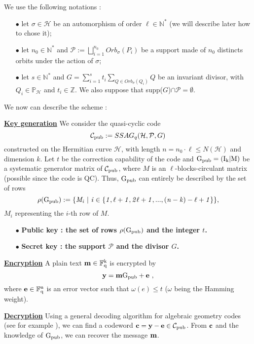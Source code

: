 \documentclass[10pt]{article}
\newcommand{\s}{\vspace{0.3cm}}
\newcommand{\cd}{\cdot}
\newcommand{\N}{\mathbb{N}}
\newcommand{\Z}{\mathbb{Z}}
\newcommand{\fq}{\mathbb{F}_q}
\newcommand{\w}{\omega}
\newcommand{\PR}{\mathcal{P}}
\begin{document}
\s

We use the following notations : 
\begin{enumerate}
\item[$\bullet$] let $\sigma \in \mathcal{H}$ be an automorphism of order $\ell \in \N^*$ (we will describe later how to chose it);
\item[$\bullet$] let $n_0 \in \N^* $ and $\PR := \bigsqcup\limits_{i=1}^{n_0} Orb_{\sigma}(P_i)$ be a support made of $n_0$ distincts orbits under the action of $\sigma$;
\item[$\bullet$] let $s \in \N^*$ and $G = \sum\limits_{i=1}^s t_i \sum\limits_{Q \in Orb_{\sigma}(Q_i)} Q$ be an invariant divisor, with $Q_i \in \mathbb{P}_{\mathcal{H}}$ and $t_i \in \Z$. We also suppose that supp($G$)$\cap \PR = \emptyset$.
\end{enumerate}

We now can describe the scheme :

\s 

\underline{\bf{Key generation}} We consider the quasi-cyclic code 
\[\mathcal{C}_{\rm pub} := SSAG_q(\mathcal{H},\PR,G)\]
constructed on the Hermitian curve $\mathcal{H}$, with length $n=n_0 \cd \ell\leq N(\mathcal{H})$ and dimension $k$. Let $t$ be the correction capability of the code and $\rm G_{pub} = (I_k | M)$ be a systematic generator matrix of $\mathcal{C}_{\rm pub}$, where $M$ is an $\ell$-blocks-circulant matrix (possible since the code is QC). Thus, $\rm G_{pub}$ can entirely be described by the set of rows
\[\rho(\rm G_{pub}) \it := \{M_i \ | \ i \in \{1,\ell+1,2\ell+1,...,(n-k)-\ell+1\}\},\]
$M_i$ representing the $i$-th row of $M$. 

\begin{enumerate}
\item[$\bullet$] \bf{Public key} : \rm the set of rows $\rho(\rm G_{pub})$ and the integer $t$.
\item[$\bullet$] \bf{Secret key} : \rm the support $\PR$ and the divisor $G$.
\end{enumerate}

\s

\underline{\bf{Encryption}} A plain text $\bf{m} \rm \in \fq^k$ is encrypted by 
\[ \bf{y} \rm = \bf{m} \it \rm G_{pub} \it + \bf{e} \ ,\]
where $\bf{e} \rm \in \fq^n$ is an error vector such that $\w(e) \leq t$ ($\w$ being the Hamming weight).

\s

\underline{\bf{Decryption}} Using a general decoding algorithm for algebraic geometry codes (see for example \cite{THRP}), we can find a codeword $\bf{c} \rm = \rm \bf{y - e} \rm \in \mathcal{C}_{\rm pub}$. From $\bf{c}$ and the knowledge of $\rm G_{pub}$, we can recover the message $\bf{m}$.
\end{document}
